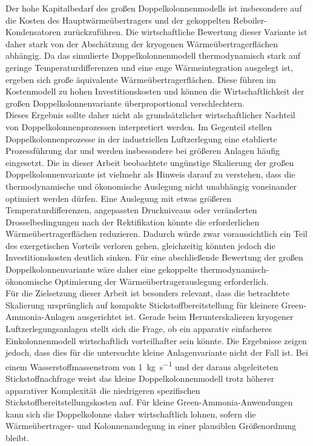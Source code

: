 Der hohe Kapitalbedarf des großen Doppelkolonnenmodells ist insbesondere auf die Kosten des Hauptwärmeübertragers und der gekoppelten Reboiler-Kondensatoren zurückzuführen. Die wirtschaftliche Bewertung dieser Variante ist daher stark von der Abschätzung der kryogenen Wärmeübertragerflächen abhängig. Da das simulierte Doppelkolonnenmodell thermodynamisch stark auf geringe Temperaturdifferenzen und eine enge Wärmeintegration ausgelegt ist, ergeben sich große äquivalente Wärmeübertragerflächen. Diese führen im Kostenmodell zu hohen Investitionskosten und können die Wirtschaftlichkeit der großen Doppelkolonnenvariante überproportional verschlechtern.\\
Dieses Ergebnis sollte daher nicht als grundsätzlicher wirtschaftlicher Nachteil von Doppelkolonnenprozessen interpretiert werden. Im Gegenteil stellen Doppelkolonnenprozesse in der industriellen Luftzerlegung eine etablierte Prozessführung dar und werden insbesondere bei größeren Anlagen häufig eingesetzt. Die in dieser Arbeit beobachtete ungünstige Skalierung der großen Doppelkolonnenvariante ist vielmehr als Hinweis darauf zu verstehen, dass die thermodynamische und ökonomische Auslegung nicht unabhängig voneinander optimiert werden dürfen. Eine Auslegung mit etwas größeren Temperaturdifferenzen, angepassten Druckniveaus oder veränderten Drosselbedingungen nach der Rektifikation könnte die erforderlichen Wärmeübertragerflächen reduzieren. Dadurch würde zwar voraussichtlich ein Teil des exergetischen Vorteils verloren gehen, gleichzeitig könnten jedoch die Investitionskosten deutlich sinken. Für eine abschließende Bewertung der großen Doppelkolonnenvariante wäre daher eine gekoppelte thermodynamisch-ökonomische Optimierung der Wärmeübertragerauslegung erforderlich.\\
Für die Zielsetzung dieser Arbeit ist besonders relevant, dass die betrachtete Skalierung ursprünglich auf kompakte Stickstoffbereitstellung für kleinere Green-Ammonia-Anlagen ausgerichtet ist. Gerade beim Herunterskalieren kryogener Luftzerlegungsanlagen stellt sich die Frage, ob ein apparativ einfacheres Einkolonnenmodell wirtschaftlich vorteilhafter sein könnte. Die Ergebnisse zeigen jedoch, dass dies für die untersuchte kleine Anlagenvariante nicht der Fall ist. Bei einem Wasserstoffmassenstrom von \SI{1}{kg.s^{-1}} und der daraus abgeleiteten Stickstoffnachfrage weist das kleine Doppelkolonnenmodell trotz höherer apparativer Komplexität die niedrigeren spezifischen Stickstoffbereitstellungskosten auf. Für kleine Green-Ammonia-Anwendungen kann sich die Doppelkolonne daher wirtschaftlich lohnen, sofern die Wärmeübertrager- und Kolonnenauslegung in einer plausiblen Größenordnung bleibt.\\
